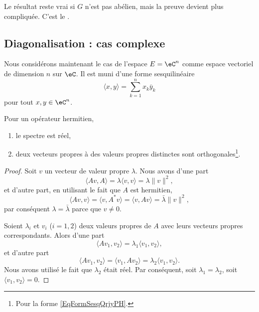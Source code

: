 Le résultat reste vrai si \( G\) n'est pas abélien, mais la preuve devient plus compliquée. C'est le .

\subsection{Diagonalisation : cas complexe}

Nous considérons maintenant le cas de l'espace \( E=\eC^n\) comme espace vectoriel de dimension \( n\) sur \( \eC\). Il est muni d'une forme sesquilinéaire
\begin{equation}    \label{EqFormSesqQrjyPH}
    \langle x, y\rangle =\sum_{k=1}^nx_k\bar y_k
\end{equation}
pour tout \( x,y\in\eC^n\).
\begin{lemma}
    Pour un opérateur hermitien,
    \begin{enumerate}
        \item
            le spectre est réel,
        \item
            deux vecteurs propres à des valeurs propres distinctes sont orthogonales\footnote{Pour la forme \eqref{EqFormSesqQrjyPH}.}.
    \end{enumerate}
\end{lemma}

\begin{proof}
    Soit \( v\) un vecteur de valeur propre \( \lambda\). Nous avons d'une part 
    \begin{equation}
        \langle Av, A\rangle =\lambda\langle v, v\rangle =\lambda\| v \|^2,
    \end{equation}
    et d'autre part, en utilisant le fait que \( A\) est hermitien,
    \begin{equation}
        \langle Av, v\rangle =\langle v, A^*v\rangle =\langle v, Av\rangle =\bar\lambda\| v \|^2,
    \end{equation}
    par conséquent \( \lambda=\bar\lambda\) parce que \( v\neq 0\).

    Soient \( \lambda_i\) et \( v_i\) (\( i=1,2\)) deux valeurs propres de \( A\) avec leurs vecteurs propres correspondants. Alors d'une part
    \begin{equation}
        \langle Av_1, v_2\rangle =\lambda_1\langle v_1, v_2\rangle ,
    \end{equation}
    et d'autre part
    \begin{equation}
        \langle Av_1, v_2\rangle =\langle v_1, Av_2\rangle =\lambda_2\langle v_1, v_2\rangle .
    \end{equation}
    Nous avons utilisé le fait que \( \lambda_2\) était réel. Par conséquent, soit \( \lambda_1=\lambda_2\), soit \( \langle v_1, v_2\rangle =0\).
\end{proof}

